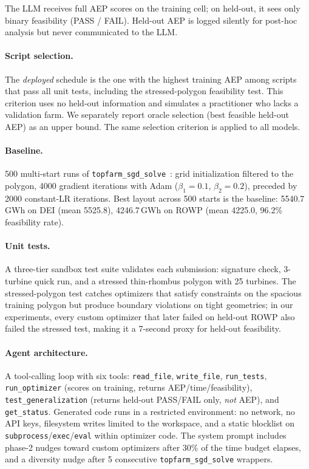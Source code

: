 The LLM receives full AEP scores on the training cell; on
held-out, it sees only binary feasibility (PASS / FAIL). Held-out
AEP is logged silently for post-hoc analysis but never
communicated to the LLM.

\paragraph{Script selection.}
The \emph{deployed} schedule is the one with the highest training
AEP among scripts that pass all unit tests, including the
stressed-polygon feasibility test. This criterion uses no held-out
information and simulates a practitioner who lacks a validation
farm. We separately report oracle selection (best feasible
held-out AEP) as an upper bound. The same selection criterion is
applied to all models.

\paragraph{Baseline.}
500 multi-start runs of \texttt{topfarm\_sgd\_solve}~\cite{pedersen2019topfarm}:
grid initialization filtered to the polygon, 4000 gradient
iterations with Adam ($\beta_1=0.1$, $\beta_2=0.2$), preceded by
2000 constant-LR iterations. Best layout across 500 starts is the
baseline: 5540.7\,GWh on DEI (mean 5525.8), 4246.7\,GWh on ROWP
(mean 4225.0, 96.2\% feasibility rate).

\paragraph{Unit tests.}
A three-tier sandbox test suite validates each submission:
signature check, 3-turbine quick run, and a stressed thin-rhombus
polygon with 25 turbines. The stressed-polygon test catches
optimizers that satisfy constraints on the spacious training
polygon but produce boundary violations on tight geometries; in
our experiments, every custom optimizer that later failed on
held-out ROWP also failed the stressed test, making it a 7-second
proxy for held-out feasibility.

\paragraph{Agent architecture.}
A tool-calling loop with six tools: \texttt{read\_file},
\texttt{write\_file}, \texttt{run\_tests}, \texttt{run\_optimizer}
(scores on training, returns AEP/time/feasibility),
\texttt{test\_generalization} (returns held-out PASS/FAIL only,
\emph{not} AEP), and \texttt{get\_status}. Generated code runs in a
restricted environment: no network, no API keys, filesystem writes
limited to the workspace, and a static blocklist on
\texttt{subprocess}/\texttt{exec}/\texttt{eval} within optimizer
code. The system prompt includes phase-2 nudges toward custom
optimizers after 30\% of the time budget elapses, and a diversity
nudge after 5 consecutive \texttt{topfarm\_sgd\_solve} wrappers.

